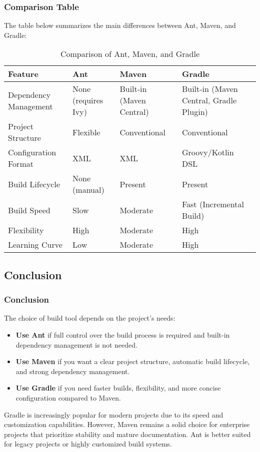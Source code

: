 \documentclass[aspectratio=169, table]{beamer}
\begin{document}
\begin{frame}[fragile]
	\frametitle{Comparison Table}
	The table below summarizes the main differences between Ant, Maven, and Gradle:
	
	\begin{table}[h]
		\centering
		\scriptsize
		\setlength{\arrayrulewidth}{0.01mm}  %
		
		\begin{tabular}{p{} p{} p{} p{}}
			\hline
			\textbf{Feature} & \textbf{Ant} & \textbf{Maven} & \textbf{Gradle} \\
			\hline
			Dependency Management & None (requires Ivy) & Built-in (Maven Central) & Built-in (Maven Central, Gradle Plugin) \\
			\hline
			Project Structure & Flexible & Conventional & Conventional \\
			\hline
			Configuration Format & XML & XML & Groovy/Kotlin DSL \\
			\hline
			Build Lifecycle & None (manual) & Present & Present \\
			\hline
			Build Speed & Slow & Moderate & Fast (Incremental Build) \\
			\hline
			Flexibility & High & Moderate & High \\
			\hline
			Learning Curve & Low & Moderate & High \\
			\hline
		\end{tabular}
		\caption{Comparison of Ant, Maven, and Gradle}
		\label{tab:comparison}
	\end{table}
\end{frame}




\subsection{Conclusion}
\begin{frame}[fragile]
	\frametitle{Conclusion}
	The choice of build tool depends on the project's needs:
	\begin{itemize}
		\item \textbf{Use Ant} if full control over the build process is required and built-in dependency management is not needed.
		\item \textbf{Use Maven} if you want a clear project structure, automatic build lifecycle, and strong dependency management.
		\item \textbf{Use Gradle} if you need faster builds, flexibility, and more concise configuration compared to Maven.
	\end{itemize}
	Gradle is increasingly popular for modern projects due to its speed and customization capabilities. However, Maven remains a solid choice for enterprise projects that prioritize stability and mature documentation. Ant is better suited for legacy projects or highly customized build systems.
\end{frame}
\end{document}
